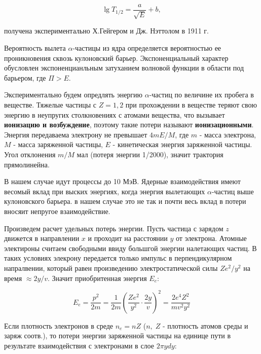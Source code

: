 \documentclass[a4paper]{article}
\begin{document}
\begin{equation}
    \lg{T_{1/2}} = \frac{a}{\sqrt{E}} + b,
\end{equation}

получена экспериментально Х.Гейгером и Дж. Нэттолом в 1911 г. \par 

Вероятность вылета $\alpha$-частицы из ядра определяется вероятностью ее проникновения сквозь кулоновский барьер.
Экспоненциальный характер обусловлен экспоненцианльным затуханием волновой функции в области под 
барьером, где $\Pi > E$. \par

Экспериментально будем опредлять энергию $\alpha$-частиц по величине  их пробега в веществе.
Тяжелые частицы с $Z = 1, 2$ при прохождении в веществе теряют  свою энергию в неупругих столкновениях 
с атомами вещества, что вызывает \textbf{ионизацию и возбуждение}, поэтому такие потери называют \textbf{ионизационными}.
Энергия передаваема электрону не превышает $4mE/M$, где $m$ - масса электрона, $M$ - масса заряженной частицы,
$E$ - кинетическая энергия заряженной частицы. Угол отклонения $m/M$ мал (потеря энергии 1/2000), 
значит трактория прямолинейна. \par

В нашем случае идут процессы до 10 МэВ. Ядерные взаимодействия имеют весомый вклад при выских энергиях, 
когда энергия вылетающих $\alpha$-частиц выше кулоновского барьера. в нашем случае это не так и 
почти весь вклад в потери вносяит непругое взаимодействие. \par 

Произведем расчет удельных потерь энергии. Пусть частица с зарядом $z$ движется в направлении $x$ 
и проходит на расстоянии $y$ от электрона. Атомные электироны считаем свободными ввиду большгой энергии 
налетающих частиц. В таких условиях элекрону передается только импульс в перпендикулярном напралвении,
который равен произведению электростатической силы $Z e^2 / y^2$ на время $\approx 2y/v$. Значит приобритенная 
энергия $E_e$:

\begin{equation}
    E_e = \frac{p^2}{2m} = \frac{1}{2m} \left ( \frac{Ze^2}{y^2} \cdot \frac{2y}{v} \right )^2 = \frac{2 e^4 Z^2}{mv^2y^2}
\end{equation}

Если плотность электронов в среде $n_e = nZ$ ($n, \; Z$ - плотность атомов среды и заряж соотв.), то потери
энергии заряженной частицы на единице пути в результате взаимодействия с электронами в слое $2 \pi y dy$:
\end{document}
